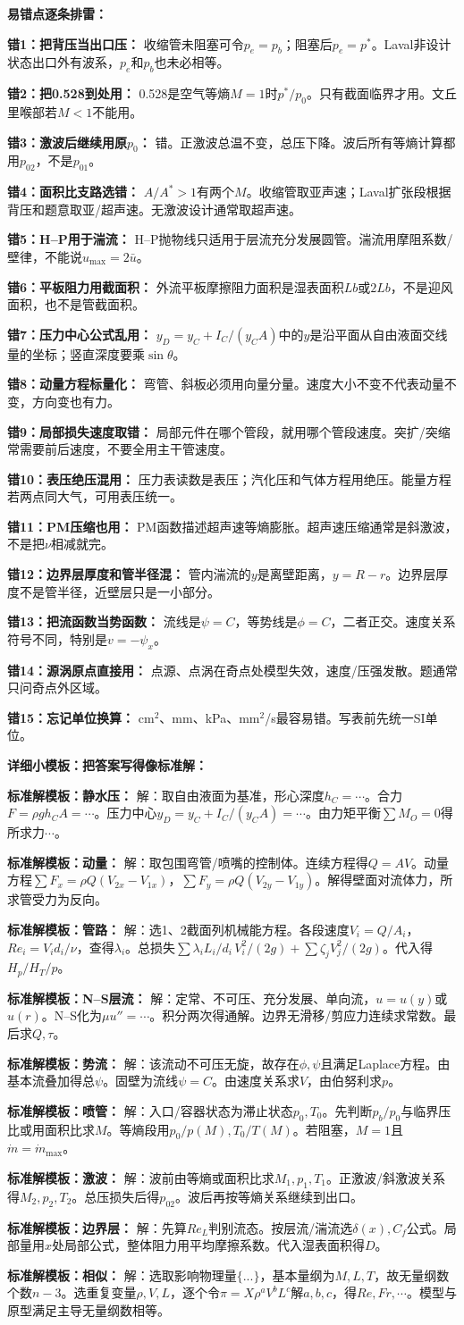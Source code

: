 \documentclass[a4paper]{article}
\newcommand{\sect}[1]{\par{\bfseries\color{Q}#1：}}
\begin{document}
\begin{multicols}{3}
{\sect{易错点逐条排雷}
\sect{错1：把背压当出口压}
收缩管未阻塞可令$p_e=p_b$；阻塞后$p_e=p^*$。Laval非设计状态出口外有波系，$p_e$和$p_b$也未必相等。
\sect{错2：把0.528到处用}
0.528是空气等熵$M=1$时$p^*/p_0$。只有截面临界才用。文丘里喉部若$M<1$不能用。
\sect{错3：激波后继续用原$p_0$}
错。正激波总温不变，总压下降。波后所有等熵计算都用$p_{02}$，不是$p_{01}$。
\sect{错4：面积比支路选错}
$A/A^*>1$有两个$M$。收缩管取亚声速；Laval扩张段根据背压和题意取亚/超声速。无激波设计通常取超声速。
\sect{错5：H--P用于湍流}
H--P抛物线只适用于层流充分发展圆管。湍流用摩阻系数/壁律，不能说$u_{\max}=2\bar u$。
\sect{错6：平板阻力用截面积}
外流平板摩擦阻力面积是湿表面积$Lb$或$2Lb$，不是迎风面积，也不是管截面积。
\sect{错7：压力中心公式乱用}
$y_D=y_C+I_C/(y_CA)$中的$y$是沿平面从自由液面交线量的坐标；竖直深度要乘$\sin\theta$。
\sect{错8：动量方程标量化}
弯管、斜板必须用向量分量。速度大小不变不代表动量不变，方向变也有力。
\sect{错9：局部损失速度取错}
局部元件在哪个管段，就用哪个管段速度。突扩/突缩常需要前后速度，不要全用主干管速度。
\sect{错10：表压绝压混用}
压力表读数是表压；汽化压和气体方程用绝压。能量方程若两点同大气，可用表压统一。
\sect{错11：PM压缩也用}
PM函数描述超声速等熵膨胀。超声速压缩通常是斜激波，不是把$\nu$相减就完。
\sect{错12：边界层厚度和管半径混}
管内湍流的$y$是离壁距离，$y=R-r$。边界层厚度不是管半径，近壁层只是一小部分。
\sect{错13：把流函数当势函数}
流线是$\psi=C$，等势线是$\phi=C$，二者正交。速度关系符号不同，特别是$v=-\psi_x$。
\sect{错14：源涡原点直接用}
点源、点涡在奇点处模型失效，速度/压强发散。题通常只问奇点外区域。
\sect{错15：忘记单位换算}
cm$^2$、mm、kPa、mm$^2$/s最容易错。写表前先统一SI单位。

\sect{详细小模板：把答案写得像标准解}
\sect{标准解模板：静水压}
解：取自由液面为基准，形心深度$h_C=\cdots$。合力$F=\rho gh_CA=\cdots$。压力中心$y_D=y_C+I_C/(y_CA)=\cdots$。由力矩平衡$\sum M_O=0$得所求力$\cdots$。
\sect{标准解模板：动量}
解：取包围弯管/喷嘴的控制体。连续方程得$Q=AV$。动量方程$\sum F_x=\rho Q(V_{2x}-V_{1x})$，$\sum F_y=\rho Q(V_{2y}-V_{1y})$。解得壁面对流体力，所求管受力为反向。
\sect{标准解模板：管路}
解：选1、2截面列机械能方程。各段速度$V_i=Q/A_i$，$Re_i=V_id_i/\nu$，查得$\lambda_i$。总损失$\sum\lambda_iL_i/d_i\,V_i^2/(2g)+\sum\zeta_jV_j^2/(2g)$。代入得$H_p/H_T/p$。
\sect{标准解模板：N--S层流}
解：定常、不可压、充分发展、单向流，$u=u(y)$或$u(r)$。N--S化为$\mu u''=\cdots$。积分两次得通解。边界无滑移/剪应力连续求常数。最后求$Q,\tau$。
\sect{标准解模板：势流}
解：该流动不可压无旋，故存在$\phi,\psi$且满足Laplace方程。由基本流叠加得总$\psi$。固壁为流线$\psi=C$。由速度关系求$V$，由伯努利求$p$。
\sect{标准解模板：喷管}
解：入口/容器状态为滞止状态$p_0,T_0$。先判断$p_b/p_0$与临界压比或用面积比求$M$。等熵段用$p_0/p(M),T_0/T(M)$。若阻塞，$M=1$且$\dot m=\dot m_{\max}$。
\sect{标准解模板：激波}
解：波前由等熵或面积比求$M_1,p_1,T_1$。正激波/斜激波关系得$M_2,p_2,T_2$。总压损失后得$p_{02}$。波后再按等熵关系继续到出口。
\sect{标准解模板：边界层}
解：先算$Re_L$判别流态。按层流/湍流选$\delta(x),C_f$公式。局部量用$x$处局部公式，整体阻力用平均摩擦系数。代入湿表面积得$D$。
\sect{标准解模板：相似}
解：选取影响物理量$\{...\}$，基本量纲为$M,L,T$，故无量纲数个数$n-3$。选重复变量$\rho,V,L$，逐个令$\pi=X\rho^aV^bL^c$解$a,b,c$，得$Re,Fr,\cdots$。模型与原型满足主导无量纲数相等。

}
\end{multicols}
\end{document}
